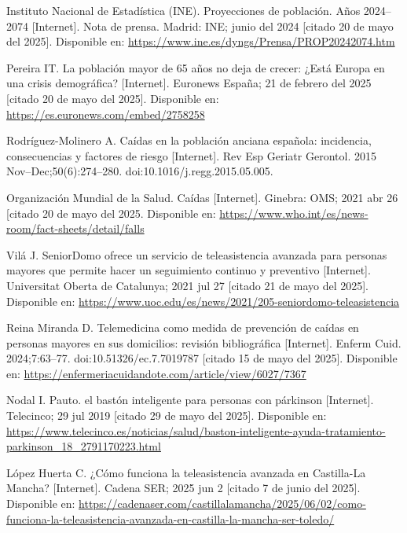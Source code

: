 \documentclass[12pt, a4paper]{article}
\begin{document}
\begin{thebibliography}{9}
	
	
	Instituto Nacional de Estadística (INE). Proyecciones de población. Años 2024–2074 [Internet]. Nota de prensa. Madrid: INE; junio del 2024  [citado 20 de mayo del 2025]. Disponible en: \url{https://www.ine.es/dyngs/Prensa/PROP20242074.htm}
	
	Pereira IT. La población mayor de 65 años no deja de crecer: ¿Está Europa en una crisis demográfica? [Internet]. Euronews España; 21 de febrero del 2025 [citado 20 de mayo del 2025]. Disponible en: \url{https://es.euronews.com/embed/2758258}
	
	Rodríguez-Molinero A.  
	Caídas en la población anciana española: incidencia, consecuencias y factores de riesgo [Internet].  
	Rev Esp Geriatr Gerontol. 2015 Nov–Dec;50(6):274–280.  
	doi:10.1016/j.regg.2015.05.005.

	Organización Mundial de la Salud. Caídas [Internet]. Ginebra: OMS; 2021 abr 26 [citado 20 de mayo del 2025. Disponible en: \url{https://www.who.int/es/news-room/fact-sheets/detail/falls}
		
	Vilá J. SeniorDomo ofrece un servicio de teleasistencia avanzada para personas mayores que permite hacer un seguimiento continuo y preventivo [Internet]. Universitat Oberta de Catalunya; 2021 jul 27 [citado 21 de mayo del 2025]. Disponible en: \url{https://www.uoc.edu/es/news/2021/205-seniordomo-teleasistencia}

	
	Reina Miranda D. Telemedicina como medida de prevención de caídas en personas mayores en sus domicilios: revisión bibliográfica [Internet]. Enferm Cuid. 2024;7:63–77. doi:10.51326/ec.7.7019787 [citado 15 de mayo del 2025]. Disponible en: \url{https://enfermeriacuidandote.com/article/view/6027/7367}
	
	
	Nodal I. Pauto. el bastón inteligente para personas con párkinson [Internet]. Telecinco; 29 jul 2019 [citado 29 de mayo del 2025]. Disponible en: \url{https://www.telecinco.es/noticias/salud/baston-inteligente-ayuda-tratamiento-parkinson_18_2791170223.html}
	
		
	López Huerta C. ¿Cómo funciona la teleasistencia avanzada en Castilla-La Mancha? [Internet]. Cadena SER; 2025 jun 2 [citado 7 de junio del 2025]. Disponible en: \url{https://cadenaser.com/castillalamancha/2025/06/02/como-funciona-la-teleasistencia-avanzada-en-castilla-la-mancha-ser-toledo/}
	

\end{thebibliography}
\end{document}
